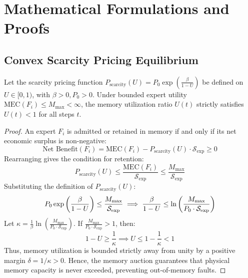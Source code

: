 \section{Mathematical Formulations and Proofs}
\label{sec:appendix_math}

\subsection{Convex Scarcity Pricing Equilibrium}
\begin{theorem}
Let the scarcity pricing function $P_{\text{scarcity}}(U) = P_0 \exp\left(\frac{\beta}{1-U}\right)$ be defined on $U \in [0, 1)$, with $\beta > 0, P_0 > 0$. Under bounded expert utility $\text{MEC}(F_i) \le M_{\max} < \infty$, the memory utilization ratio $U(t)$ strictly satisfies $U(t) < 1$ for all steps $t$.
\end{theorem}

\begin{proof}
An expert $F_i$ is admitted or retained in memory if and only if its net economic surplus is non-negative:
\begin{equation}
    \text{Net Benefit}(F_i) = \text{MEC}(F_i) - P_{\text{scarcity}}(U) \cdot \mathcal{S}_{\text{exp}} \ge 0
\end{equation}
Rearranging gives the condition for retention:
\begin{equation}
    P_{\text{scarcity}}(U) \le \frac{\text{MEC}(F_i)}{\mathcal{S}_{\text{exp}}} \le \frac{M_{\max}}{\mathcal{S}_{\text{exp}}}
\end{equation}
Substituting the definition of $P_{\text{scarcity}}(U)$:
\begin{equation}\small
    P_0 \exp\left( \frac{\beta}{1 - U} \right) \le \frac{M_{\max}}{\mathcal{S}_{\text{exp}}} \implies \frac{\beta}{1 - U} \le \ln\left( \frac{M_{\max}}{P_0 \cdot \mathcal{S}_{\text{exp}}} \right)
\end{equation}
Let $\kappa = \frac{1}{\beta} \ln\left( \frac{M_{\max}}{P_0 \cdot \mathcal{S}_{\text{exp}}} \right)$. If $\frac{M_{\max}}{P_0 \cdot \mathcal{S}_{\text{exp}}} > 1$, then:
\begin{equation}
    1 - U \ge \frac{1}{\kappa} \implies U \le 1 - \frac{1}{\kappa} < 1
\end{equation}
Thus, memory utilization is bounded strictly away from unity by a positive margin $\delta = 1/\kappa > 0$. Hence, the memory auction guarantees that physical memory capacity is never exceeded, preventing out-of-memory faults.
\end{proof}

